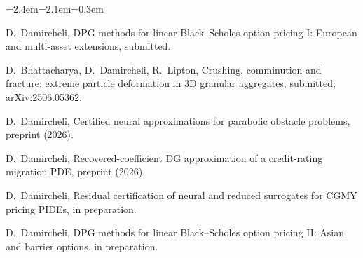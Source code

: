 \documentclass[11pt]{article}
\newcommand{\rc}[1]{\textcolor{accent}{[#1]}}
\begin{document}
{\begin{list}{}{\leftmargin=2.4em=2.1em=0.3em\itemsep=0pt\parsep=0pt}
\item[\rc{S3}] D.~Damircheli, DPG methods for linear Black--Scholes option pricing I: European and multi-asset extensions, submitted.
\item[\rc{S5}] D.~Bhattacharya, D.~Damircheli, R.~Lipton, Crushing, comminution and fracture: extreme particle deformation in 3D granular aggregates, submitted; arXiv:2506.05362.
\item[\rc{P1}] D.~Damircheli, Certified neural approximations for parabolic obstacle problems, preprint (2026).
\item[\rc{P2}] D.~Damircheli, Recovered-coefficient DG approximation of a credit-rating migration PDE, preprint (2026).
\item[\rc{M1}] D.~Damircheli, Residual certification of neural and reduced surrogates for CGMY pricing PIDEs, in preparation.
\item[\rc{M2}] D.~Damircheli, DPG methods for linear Black--Scholes option pricing II: Asian and barrier options, in preparation.
\end{list}
}
\end{document}
